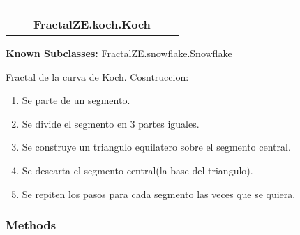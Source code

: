     \label{FractalZE:koch:Koch}
\begin{tabular}{cccccc}
\multicolumn{2}{r}{\settowidth{\BCL}{FractalZE.fractal.Fractal}\multirow{2}{\BCL}{FractalZE.fractal.Fractal}}
&&
  \\\cline{3-3}
  &&\multicolumn{1}{c|}{}
&&
  \\
&&\multicolumn{2}{l}{\textbf{FractalZE.koch.Koch}}
\end{tabular}

\textbf{Known Subclasses:} FractalZE.snowflake.Snowflake

Fractal de la curva de Koch. Cosntruccion:

\begin{enumerate}

\setlength{\parskip}{0.5ex}
  \item Se parte de un segmento.

  \item Se divide el segmento en 3 partes iguales.

  \item Se construye un triangulo equilatero sobre el segmento central.

  \item Se descarta el segmento central(la base del triangulo).

  \item Se repiten los pasos para cada segmento las veces que se quiera.

\end{enumerate}



  \subsubsection{Methods}

    \label{FractalZE:koch:Koch:__init__}

    \vspace{0.5ex}

